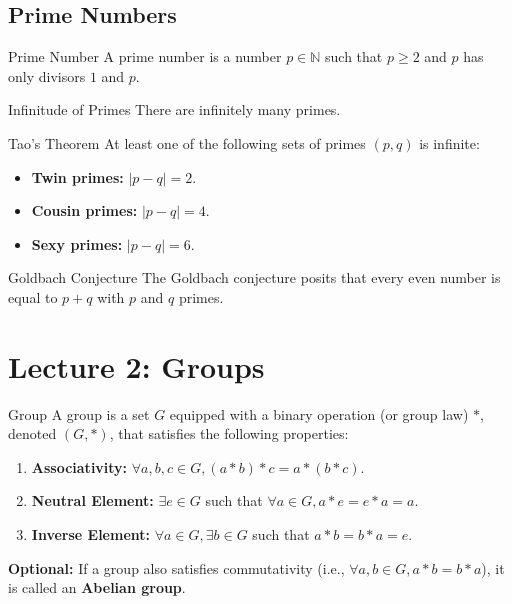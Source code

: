 \documentclass[11pt, a4paper]{article}
\newcommand{\N}{\mathbb{N}}
\begin{document}
\subsection{Prime Numbers}

\begin{definition}{Prime Number}{}
A prime number is a number $p \in \N$ such that $p \geq 2$ and $p$ has only divisors $1$ and $p$.
\end{definition}

\begin{theorem}{Infinitude of Primes}{}
There are infinitely many primes.
\end{theorem}

\begin{theorem}{Tao's Theorem}{}
At least one of the following sets of primes $(p, q)$ is infinite:
\begin{itemize}
    \item \textbf{Twin primes:} $\vert{}p-q\vert{} = 2$.
    \item \textbf{Cousin primes:} $\vert{}p-q\vert{} = 4$.
    \item \textbf{Sexy primes:} $\vert{}p-q\vert{} = 6$.
\end{itemize}
\end{theorem}

\begin{remark}{Goldbach Conjecture}{}
The Goldbach conjecture posits that every even number is equal to $p+q$ with $p$ and $q$ primes.
\end{remark}

\section{Lecture 2: Groups}

\begin{definition}{Group}{}
A group is a set $G$ equipped with a binary operation (or group law) $*$, denoted $(G, *)$, that satisfies the following properties:
\begin{enumerate}
    \item \textbf{Associativity:} $\forall a, b, c \in G, (a * b) * c = a * (b * c)$.
    \item \textbf{Neutral Element:} $\exists e \in G$ such that $\forall a \in G, a * e = e * a = a$.
    \item \textbf{Inverse Element:} $\forall a \in G, \exists b \in G$ such that $a * b = b * a = e$.
\end{enumerate}
\textbf{Optional:} If a group also satisfies commutativity (i.e., $\forall a, b \in G, a * b = b * a$), it is called an \textbf{Abelian group}.
\end{definition}
\end{document}
